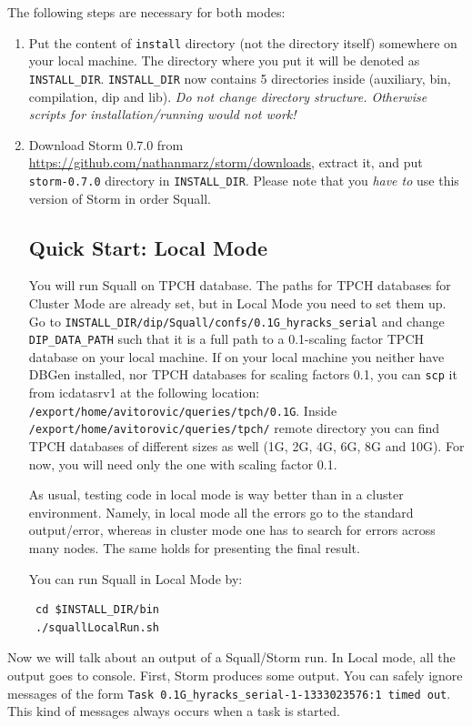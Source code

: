 \documentclass[a4paper,10pt]{article}
\begin{document}
The following steps are necessary for both modes:
\begin{enumerate}
 \item Put the content of \verb#install# directory (not the directory itself) somewhere on your local machine. The directory where you put it will be denoted as \verb#INSTALL_DIR#. \verb#INSTALL_DIR# now contains 5 directories inside (auxiliary, bin, compilation, dip and lib). \textit{Do not change directory structure. Otherwise scripts for installation/running would not work!}
 \item Download Storm 0.7.0 from \url{https://github.com/nathanmarz/storm/downloads}, extract it, and put \verb#storm-0.7.0# directory in \verb#INSTALL_DIR#. Please note that you \textit{have to} use this version of Storm in order Squall.
 
\subsection{Quick Start: Local Mode}
You will run Squall on TPCH database. The paths for TPCH databases for Cluster Mode are already set, but in Local Mode you need to set them up. Go to \verb#INSTALL_DIR/dip/Squall/confs/0.1G_hyracks_serial# and change \verb#DIP_DATA_PATH# such that it is a full path to a 0.1-scaling factor TPCH database on your local machine. If on your local machine you neither have DBGen installed, nor TPCH databases for scaling factors 0.1, you can \verb#scp# it from icdatasrv1 at the following location: \\ \verb#/export/home/avitorovic/queries/tpch/0.1G#. Inside \\ \verb#/export/home/avitorovic/queries/tpch/# remote directory you can find TPCH databases of different sizes as well (1G, 2G, 4G, 6G, 8G and 10G). For now, you will need only the one with scaling factor 0.1.

As usual, testing code in local mode is way better than in a cluster environment. Namely, in local mode all the errors go to the standard output/error, whereas in cluster mode one has to search for errors across many nodes. The same holds for presenting the final result.

You can run Squall in Local Mode by:
\begin{verbatim}
 cd $INSTALL_DIR/bin
 ./squallLocalRun.sh
\end{verbatim}
\end{enumerate}

Now we will talk about an output of a Squall/Storm run. In Local mode, all the output goes to console. First, Storm produces some output. You can safely ignore messages of the form \verb#Task 0.1G_hyracks_serial-1-1333023576:1 timed out#. This kind of messages always occurs when a task is started.
\end{document}
